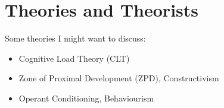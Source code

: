 \documentclass[12pt]{report}
\begin{document}
\chapter{Theories and Theorists}
\label{chap:theories}

Some theories I might want to discuss:
\begin{itemize}
  \item Cognitive Load Theory (CLT)
  \item Zone of Proximal Development (ZPD), Constructivism
  \item Operant Conditioning, Behaviourism
\end{itemize}



{}

\end{document}
